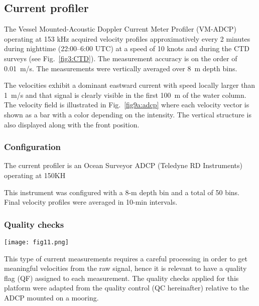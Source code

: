 \documentclass[essd,manuscript]{copernicus}
\begin{document}
\subsection{Current profiler\label{sec:adcp}}

The Vessel Mounted-Acoustic Doppler Current Meter Profiler (VM-ADCP) operating at 153 kHz acquired velocity profiles approximatively every 2 minutes during nighttime (22:00--6:00 UTC) at a speed of 10 knots and during the CTD surveys (see Fig.~\ref{fig3:CTD}). The measurement accuracy is on the order of 0.01~m/s. The measurements were vertically averaged over 8~m depth bins.

The velocities exhibit a dominant eastward current with speed locally larger than 1~m/s and that signal is clearly visible in the first 100~m of the water column. The velocity field is illustrated in Fig.~\ref{fig9a:adcp} where each velocity vector is shown as a bar with a color depending on the intensity. The vertical structure is also displayed along with the front position.

\subsubsection{Configuration}

The current profiler is an Ocean Surveyor ADCP (Teledyne RD Instruments) operating at 150KH 

This instrument was configured  with a 
8-m depth bin and a total of 50 bins. Final velocity profiles were averaged in 10-min intervals.

\subsubsection{Quality checks}



\begin{figure*}[ht]
\texttt{[image: fig11.png]}
\caption{Velocity field obtained with the ADCP at a 40~m depth (left panel) and sections of zonal velocity on May 26 (S1) and 27 (S2). The locations of the sections are indicated by dashed rectangles on the map. Only data with a quality flag equal to 1 (good data) are represented\label{fig9a:adcp}}
\end{figure*}

This type of current measurements requires a careful processing in order to get meaningful velocities from the raw signal, hence it is relevant to have a quality flag (QF) assigned to each measurement. The quality checks applied for this platform were adapted from the quality control (QC hereinafter) relative to the ADCP mounted on a mooring.
\end{document}
